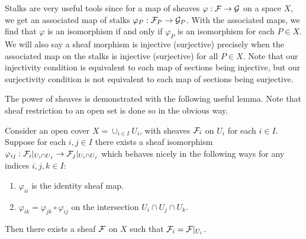 Stalks are very useful tools since for a map of sheaves $\varphi : \mathcal{F} \to \mathcal{G}$ on a space $X$,
we get an associated map of stalks $\varphi_P : \mathcal{F}_P \to \mathcal{G}_P$.
With the associated maps, we find that $\varphi$ is an isomorphism if and only if $\varphi_P$ is an isomorphism for each $P \in X$.
We will also say a sheaf morphism is injective (surjective) precisely when the associated map on the stalks is injective (surjective) for all $P \in X$.
Note that our injectivity condition is equivalent to each map of sections being injective,
but our surjectivity condition is not equivalent to each map of sections being surjective.

The power of sheaves is demonstrated with the following useful lemma.
Note that sheaf restriction to an open set is done so in the obvious way.

\begin{lemma}
    Consider an open cover $X = \cup_{i \in I} U_i$, with sheaves $\mathcal{F}_i$ on $U_i$ for each $i \in I$.
    Suppose for each $i, j \in I$ there exists a sheaf isomorphism $\varphi_{i j} : \mathcal{F}_i|_{U_i \cap U_j} \to \mathcal{F}_j|_{U_i \cap U_j}$ which behaves nicely in the following ways for any indices $i, j, k \in I$: 
    \begin{enumerate}
        \item $\varphi_{i i}$ is the identity sheaf map.
        \item $\varphi_{i k} = \varphi_{j k} \circ \varphi_{i j}$ on the intersection $U_i \cap U_j \cap U_k$.
    \end{enumerate}
    Then there exists a sheaf $\mathcal{F}$ on $X$ such that $\mathcal{F}_i = \mathcal{F}|_{U_i}$.
\end{lemma}

